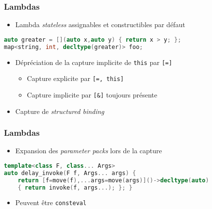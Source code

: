 \documentclass[C++.tex]{subfiles}
\begin{document}
\begin{frame}[fragile]
	\frametitle{Lambdas}
	\begin{itemize}
		\item Lambda \textit{stateless} assignables et constructibles par défaut

	\end{itemize}

	\begin{lstlisting}[language=C++]
auto greater = [](auto x,auto y) { return x > y; };
map<string, int, decltype(greater)> foo;\end{lstlisting}

	\begin{itemize}
		\item Dépréciation de la capture implicite de \lstinline|this| par \lstinline|[=]|
		\begin{itemize}
			\item Capture explicite par \lstinline|[=, this]|


			\item Capture implicite par \lstinline|[&]| toujours présente
		\end{itemize}
		\item Capture de \textit{structured binding}
	\end{itemize}
\end{frame}

\begin{frame}[fragile]
	\frametitle{Lambdas}
	\begin{itemize}
		\item Expansion des \textit{parameter packs} lors de la capture
	\end{itemize}

	\begin{lstlisting}[language=C++]
template<class F, class... Args>
auto delay_invoke(F f, Args... args) {
	return [f=move(f),...args=move(args)]()->decltype(auto) 
	{ return invoke(f, args...); }; }\end{lstlisting}

	\begin{itemize}
		\item Peuvent être \lstinline|consteval|
	\end{itemize}
\end{frame}
\end{document}
